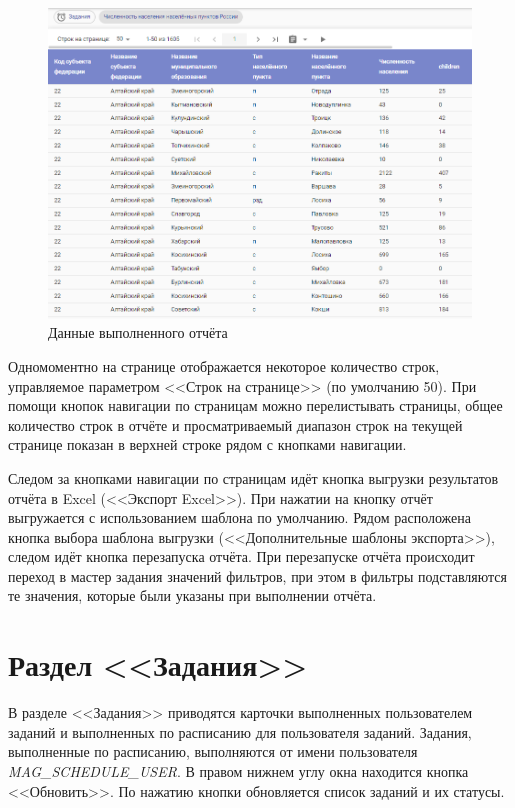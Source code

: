 \documentclass[../user-manual.tex]{subfiles}
\begin{document}
	\begin{figure}[h]
		\centering
		\includegraphics[width=\graphicswidth]{img/6-report-data.png}
		\caption{Данные выполненного отчёта}
		\label{fig:report-data}
	\end{figure}	

	Одномоментно на странице отображается некоторое количество строк, управляемое параметром <<Строк на странице>> (по умолчанию 50). При помощи кнопок навигации по страницам можно перелистывать страницы, общее количество строк в отчёте и просматриваемый диапазон строк на текущей странице показан в верхней строке рядом с кнопками навигации.
	
	Следом за кнопками навигации по страницам идёт кнопка выгрузки результатов отчёта в Excel (<<Экспорт Excel>>). При нажатии на кнопку отчёт выгружается с использованием шаблона по умолчанию. Рядом расположена кнопка выбора шаблона выгрузки (<<Дополнительные шаблоны экспорта>>), следом идёт кнопка перезапуска отчёта. При перезапуске отчёта происходит переход в мастер задания значений фильтров, при этом в фильтры подставляются те значения, которые были указаны при выполнении отчёта.
	
	\section{Раздел <<Задания>>}
	
	В разделе <<Задания>> приводятся карточки выполненных пользователем заданий и выполненных по расписанию для пользователя заданий. Задания, выполненные по расписанию, выполняются от имени пользователя \textit{MAG\_SCHEDULE\_USER}. В правом нижнем углу окна находится кнопка <<Обновить>>. По нажатию кнопки обновляется список заданий и их статусы.
	
\end{document}

